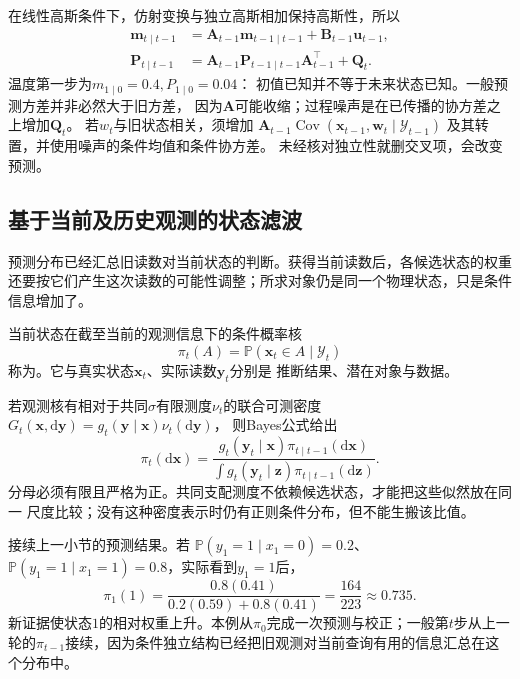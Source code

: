在线性高斯条件下，仿射变换与独立高斯相加保持高斯性，所以
\begin{align}
 \bm m_{t\mid t-1}
   &=\bm A_{t-1}\bm m_{t-1\mid t-1}+\bm B_{t-1}\bm u_{t-1},
       \label{eq:dynamical-kalman-predicted-mean}\\
 \bm P_{t\mid t-1}
   &=\bm A_{t-1}\bm P_{t-1\mid t-1}\bm A_{t-1}^\top+\bm Q_t.
       \label{eq:dynamical-kalman-predicted-covariance}
\end{align}
温度第一步为$m_{1\mid0}=0.4,P_{1\mid0}=0.04$：
初值已知并不等于未来状态已知。一般预测方差并非必然大于旧方差，
因为$\bm A$可能收缩；过程噪声是在已传播的协方差之上增加$\bm Q_t$。
若$w_t$与旧状态相关，须增加
$\bm A_{t-1}\operatorname{Cov}(\bm x_{t-1},\bm w_t\mid\mathcal Y_{t-1})$
及其转置，并使用噪声的条件均值和条件协方差。
未经核对独立性就删交叉项，会改变预测。

\subsection{基于当前及历史观测的状态滤波}
预测分布已经汇总旧读数对当前状态的判断。获得当前读数后，各候选状态的权重还要按它们产生这次读数的可能性调整；所求对象仍是同一个物理状态，只是条件信息增加了。

\begin{definition}[滤波分布]
 \label{def:dynamical-filtering-distribution}
 当前状态在截至当前的观测信息下的条件概率核
 \begin{equation}
  \pi_t(A)=\mathbb P(\bm x_t\in A\mid\mathcal Y_t)
   \label{eq:dynamical-filtering-distribution}
 \end{equation}
 称为。它与真实状态$\bm x_t$、实际读数$\bm y_t$分别是
 推断结果、潜在对象与数据。
\end{definition}

若观测核有相对于共同$\sigma$有限测度$\nu_t$的联合可测密度
$G_t(\bm x,\mathrm d\bm y)=g_t(\bm y\mid\bm x)\nu_t(\mathrm d\bm y)$，
则Bayes公式给出
\begin{equation}
 \pi_t(\mathrm d\bm x)=
 \frac{g_t(\bm y_t\mid\bm x)\pi_{t\mid t-1}(\mathrm d\bm x)}
      {\int g_t(\bm y_t\mid\bm z)\pi_{t\mid t-1}(\mathrm d\bm z)}.
 \label{eq:dynamical-general-bayes-filter}
\end{equation}
分母必须有限且严格为正。共同支配测度不依赖候选状态，才能把这些似然放在同一
尺度比较；没有这种密度表示时仍有正则条件分布，但不能生搬该比值。

\begin{example}[两状态模型的一次预测与校正]
 \label{ex:dynamical-two-state-bayes-filter}
 接续上一小节的预测结果。若
 $\mathbb P(y_1=1\mid x_1=0)=0.2$、
 $\mathbb P(y_1=1\mid x_1=1)=0.8$，实际看到$y_1=1$后，
 \[
  \pi_1(1)=\frac{0.8(0.41)}{0.2(0.59)+0.8(0.41)}
              =\frac{164}{223}\approx0.735.
 \]
 新证据使状态$1$的相对权重上升。本例从$\pi_0$完成一次预测与校正；一般第$t$步从上一轮的$\pi_{t-1}$接续，因为条件独立结构已经把旧观测对当前查询有用的信息汇总在这个分布中。
\end{example}

